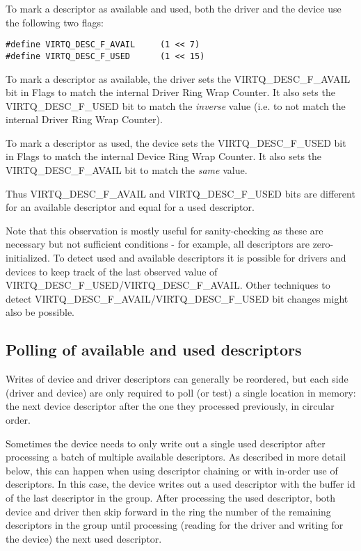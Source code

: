 To mark a descriptor as available and used, both the driver and
the device use the following two flags:
\begin{lstlisting}
#define VIRTQ_DESC_F_AVAIL     (1 << 7)
#define VIRTQ_DESC_F_USED      (1 << 15)
\end{lstlisting}

To mark a descriptor as available, the driver sets the
VIRTQ_DESC_F_AVAIL bit in Flags to match the internal Driver
Ring Wrap Counter.  It also sets the VIRTQ_DESC_F_USED bit to match the
\emph{inverse} value (i.e. to not match the internal Driver Ring
Wrap Counter).

To mark a descriptor as used, the device sets the
VIRTQ_DESC_F_USED bit in Flags to match the internal Device
Ring Wrap Counter.  It also sets the VIRTQ_DESC_F_AVAIL bit to match the
\emph{same} value.

Thus VIRTQ_DESC_F_AVAIL and VIRTQ_DESC_F_USED bits are different
for an available descriptor and equal for a used descriptor.

Note that this observation is mostly useful for sanity-checking
as these are necessary but not sufficient conditions - for
example, all descriptors are zero-initialized. To detect used and
available descriptors it is possible for drivers and devices to
keep track of the last observed value of
VIRTQ_DESC_F_USED/VIRTQ_DESC_F_AVAIL.  Other techniques to detect
VIRTQ_DESC_F_AVAIL/VIRTQ_DESC_F_USED bit changes might also be
possible.

\subsection{Polling of available and used descriptors}
\label{sec:Packed Virtqueues / Polling of available and used descriptors}

Writes of device and driver descriptors can generally be
reordered, but each side (driver and device) are only required to
poll (or test) a single location in memory: the next device descriptor after
the one they processed previously, in circular order.

Sometimes the device needs to only write out a single used descriptor
after processing a batch of multiple available descriptors.  As
described in more detail below, this can happen when using
descriptor chaining or with in-order
use of descriptors.  In this case, the device writes out a used
descriptor with the buffer id of the last descriptor in the group.
After processing the used descriptor, both device and driver then
skip forward in the ring the number of the remaining descriptors
in the group until processing (reading for the driver and writing
for the device) the next used descriptor.


